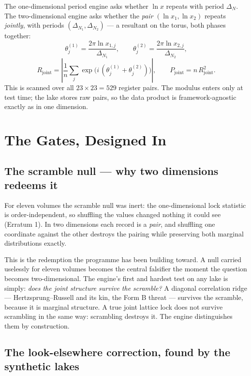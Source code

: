 \documentclass[11pt, letterpaper, openany]{book}
\begin{document}
The one-dimensional period engine asks whether $\ln x$ repeats with period $\Delta_N$. The
two-dimensional engine asks whether the \emph{pair} $(\ln x_1, \ln x_2)$ repeats \emph{jointly},
with periods $(\Delta_{N_1}, \Delta_{N_2})$ --- a resultant on the torus, both phases together:
\[
\theta^{(1)}_j = \frac{2\pi \ln x_{1,j}}{\Delta_{N_1}}, \qquad
\theta^{(2)}_j = \frac{2\pi \ln x_{2,j}}{\Delta_{N_2}},
\]
\[
R_{\mathrm{joint}} = \left| \frac{1}{n}\sum_j \exp\!\big( i\,(\theta^{(1)}_j + \theta^{(2)}_j) \big) \right|,
\qquad P_{\mathrm{joint}} = n\,R_{\mathrm{joint}}^2 .
\]
This is scanned over all $23 \times 23 = 529$ register pairs. The modulus enters only at test time;
the lake stores raw pairs, so the data product is framework-agnostic exactly as in one dimension.

\section{The Gates, Designed In}

\subsection{The scramble null --- why two dimensions redeems it}

For eleven volumes the scramble null was inert: the one-dimensional lock statistic is
order-independent, so shuffling the values changed nothing it could see (Erratum 1). In two
dimensions each record is a \emph{pair}, and shuffling one coordinate against the other destroys the
pairing while preserving both marginal distributions exactly.

\begin{signalbox}
This is the redemption the programme has been building toward. A null carried uselessly for eleven
volumes becomes the central falsifier the moment the question becomes two-dimensional. The engine's
first and hardest test on any lake is simply: \emph{does the joint structure survive the scramble?}
A diagonal correlation ridge --- Hertzsprung--Russell and its kin, the Form B threat --- survives
the scramble, because it is marginal structure. A true joint lattice lock does not survive scrambling
in the same way: scrambling destroys it. The engine distinguishes them by construction.
\end{signalbox}

\subsection{The look-elsewhere correction, found by the synthetic lakes}
\end{document}
